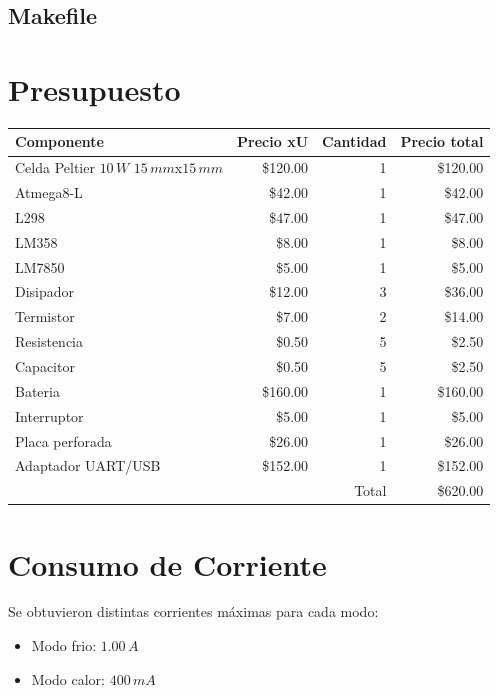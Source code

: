 \documentclass[10pt,spanish,a4paper,openany,notitlepage]{article}
\begin{document}
\subsection{Makefile}


\newpage
\section{Presupuesto}

\begin{center}
\begin{tabular}{|l|r|r|r|}\hline
Componente&Precio xU&Cantidad&Precio total\\ \hline
Celda Peltier $10\, \unit{W}$ $15\, \unit{mm}$x$15\, \unit{mm}$ &\$120.00&1&\$120.00\\ \hline
Atmega8-L &\$42.00&1&\$42.00\\ \hline
L298 &\$47.00&1&\$47.00\\ \hline
LM358 &\$8.00&1&\$8.00\\ \hline
LM7850 &\$5.00&1&\$5.00\\ \hline
Disipador &\$12.00&3&\$36.00\\ \hline
Termistor &\$7.00&2&\$14.00\\ \hline
Resistencia &\$0.50&5&\$2.50\\ \hline
Capacitor &\$0.50&5&\$2.50\\ \hline 
Bateria &\$160.00&1&\$160.00\\ \hline
Interruptor &\$5.00&1&\$5.00\\ \hline
Placa perforada &\$26.00&1&\$26.00\\ \hline
Adaptador UART/USB & \$152.00 & 1 & \$152.00 \\ \hline 
\multicolumn{3}{|r|}{Total}&\$620.00\\ \hline
\end{tabular}
\end{center}

\section{Consumo de Corriente}

Se obtuvieron distintas corrientes máximas para cada modo:

\begin{itemize}
\item{Modo frio:} $1.00\, \unit{A}$
\item{Modo calor:} $400\, \unit{mA}$
\end{itemize} 
\end{document}
